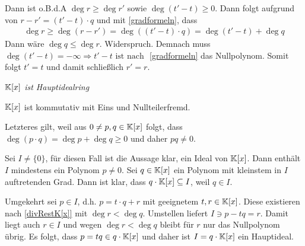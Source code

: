 \begin{mylemma}
\begin{itemize}
            Dann ist o.B.d.A $\deg r \geq \deg r'$ sowie $\deg(t' - t) \geq 0$. Dann folgt aufgrund von $r - r' = (t' - t) \cdot q$ und mit \ref{gradformeln}, dass
            \begin{align*}
                \deg r \geq \deg(r - r') = \deg ((t' - t) \cdot q) = \deg(t' - t) + \deg q
            \end{align*}
            Dann wäre $\deg q \leq \deg r$. Widerspruch.
            Demnach muss $\deg(t' - t)= -\infty \Rightarrow t' - t \mbox{ ist nach }$ \ref{gradformeln} das Nullpolynom.
            Somit folgt $t' = t$ und damit schließlich $r' = r$.
    \end{itemize}
\end{mylemma}


\begin{mysatz}\textit{$\mathbb{K}[x]$ ist  Hauptidealring}\medskip

    $\mathbb{K}[x]$ ist kommutativ mit Eins und Nullteilerfremd.

    Letzteres gilt, weil aus $0 \neq p, q \in \mathbb{K}[x]$ folgt, dass $\deg (p \cdot q) = \deg p + \deg q \geq 0$ und daher $pq \neq 0$.

    Sei $I \neq \{ 0 \}$, für diesen Fall ist die Aussage klar, ein Ideal von $\mathbb{K}[x]$.
    Dann enthält $I$ mindestens ein Polynom $p \neq 0$.
    Sei $q \in \mathbb{K}[x]$ ein Polynom mit kleinstem in $I$ auftretenden Grad.
    Dann ist klar, dass $q \cdot \mathbb{K}[x] \subseteq I$, weil $q \in I$.

    Umgekehrt sei $p \in I$, d.h. $p = t \cdot q + r$ mit geeignetem $t, r \in \mathbb{K}[x]$.
    Diese existieren nach \ref{divRestK[x]} mit $\deg r < \deg q$.
    Umstellen liefert $I \ni p - tq = r$.
    Damit liegt auch $r \in I$ und wegen $\deg r < \deg q$ bleibt für $r$ nur das Nullpolynom übrig.
    Es folgt, dass $p = tq \in q \cdot \mathbb{K}[x]$ und daher ist $I = q \cdot \mathbb{K}[x]$ ein Hauptideal.
\end{mysatz}


